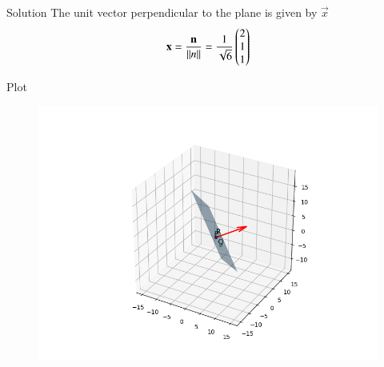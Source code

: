 \documentclass{beamer}
\begin{document}
\begin{frame}{Solution}
The unit vector perpendicular to the plane is given by $\vec{x}$
\begin{align}
     \mathbf{x}= \frac{\mathbf{n}}{||n||} =   \frac{1}{\sqrt{6}}\begin{pmatrix}2\\1\\1\end{pmatrix}
\end{align}
\end{frame}

\begin{frame}{Plot}
    \begin{figure}[H]
    \centering
    \includegraphics[width=0.6\columnwidth]{../figs/fig.png}
    \label{fig:1}
\end{figure}
\end{frame}
\end{document}
